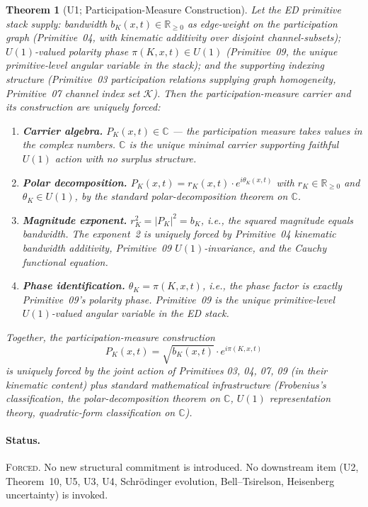 \documentclass[11pt,a4paper]{article}
\newtheorem{theorem}{Theorem}[section]
\begin{document}
\begin{theorem}[U1; Participation-Measure Construction]
Let the ED primitive stack supply: bandwidth $b_K(x, t) \in \mathbb{R}_{\geq 0}$ as edge-weight on the participation graph (Primitive~04, with kinematic additivity over disjoint channel-subsets); $U(1)$-valued polarity phase $\pi(K, x, t) \in U(1)$ (Primitive~09, the unique primitive-level angular variable in the stack); and the supporting indexing structure (Primitive~03 participation relations supplying graph homogeneity, Primitive~07 channel index set $\mathcal{K}$). Then the participation-measure carrier and its construction are uniquely forced:

\begin{enumerate}
  \item \textbf{Carrier algebra.} $P_K(x, t) \in \mathbb{C}$ --- the participation measure takes values in the complex numbers. $\mathbb{C}$ is the unique minimal carrier supporting faithful $U(1)$ action with no surplus structure.
  \item \textbf{Polar decomposition.} $P_K(x, t) = r_K(x, t) \cdot e^{i \theta_K(x, t)}$ with $r_K \in \mathbb{R}_{\geq 0}$ and $\theta_K \in U(1)$, by the standard polar-decomposition theorem on $\mathbb{C}$.
  \item \textbf{Magnitude exponent.} $r_K^2 = |P_K|^2 = b_K$, i.e., the squared magnitude equals bandwidth. The exponent~2 is uniquely forced by Primitive~04 kinematic bandwidth additivity, Primitive~09 $U(1)$-invariance, and the Cauchy functional equation.
  \item \textbf{Phase identification.} $\theta_K = \pi(K, x, t)$, i.e., the phase factor is exactly Primitive~09's polarity phase. Primitive~09 is the unique primitive-level $U(1)$-valued angular variable in the ED stack.
\end{enumerate}

Together, the participation-measure construction
\[
P_K(x, t) = \sqrt{b_K(x, t)} \cdot e^{i \pi(K, x, t)}
\]
is uniquely forced by the joint action of Primitives 03, 04, 07, 09 (in their kinematic content) plus standard mathematical infrastructure (Frobenius's classification, the polar-decomposition theorem on $\mathbb{C}$, $U(1)$ representation theory, quadratic-form classification on $\mathbb{C}$).
\end{theorem}

\paragraph{Status.} \textsc{Forced}. No new structural commitment is introduced. No downstream item (U2, Theorem~10, U5, U3, U4, Schr\"odinger evolution, Bell--Tsirelson, Heisenberg uncertainty) is invoked.
\end{document}

